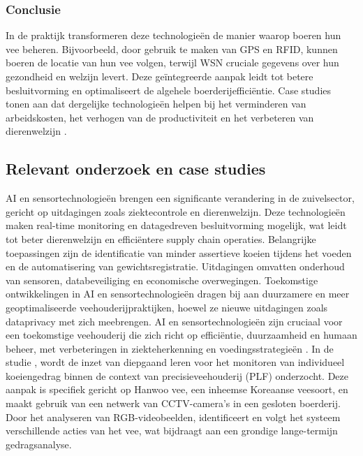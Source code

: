 \subsubsection{Conclusie}
In de praktijk transformeren deze technologieën de manier waarop boeren hun vee beheren. Bijvoorbeeld, door gebruik te maken van GPS en RFID, kunnen boeren de locatie van hun vee volgen, terwijl WSN cruciale gegevens over hun gezondheid en welzijn levert. Deze geïntegreerde aanpak leidt tot betere besluitvorming en optimaliseert de algehele boerderijefficiëntie. Case studies tonen aan dat dergelijke technologieën helpen bij het verminderen van arbeidskosten, het verhogen van de productiviteit en het verbeteren van dierenwelzijn \autocite{mohamed2021smart}.


\subsection{Relevant onderzoek en case studies}
\newline
AI en sensortechnologieën brengen een significante verandering in de zuivelsector, gericht op uitdagingen zoals ziektecontrole en dierenwelzijn. Deze technologieën maken real-time monitoring en datagedreven besluitvorming mogelijk, wat leidt tot beter dierenwelzijn en efficiëntere supply chain operaties. Belangrijke toepassingen zijn de identificatie van minder assertieve koeien tijdens het voeden en de automatisering van gewichtsregistratie. Uitdagingen omvatten onderhoud van sensoren, databeveiliging en economische overwegingen. Toekomstige ontwikkelingen in AI en sensortechnologieën dragen bij aan duurzamere en meer geoptimaliseerde veehouderijpraktijken, hoewel ze nieuwe uitdagingen zoals dataprivacy met zich meebrengen. 
AI en sensortechnologieën zijn cruciaal voor een toekomstige veehouderij die zich richt op efficiëntie, duurzaamheid en humaan beheer, met verbeteringen in ziekteherkenning en voedingsstrategieën \autocite{MDPIAIandSensors}.
\newline
In de studie \textcite{Fuentes2023}, wordt de inzet van diepgaand leren voor het monitoren van individueel koeiengedrag binnen de context van precisieveehouderij (PLF) onderzocht. Deze aanpak is specifiek gericht op Hanwoo vee, een inheemse Koreaanse veesoort, en maakt gebruik van een netwerk van CCTV-camera's in een gesloten boerderij. Door het analyseren van RGB-videobeelden, identificeert en volgt het systeem verschillende acties van het vee, wat bijdraagt aan een grondige lange-termijn gedragsanalyse.

